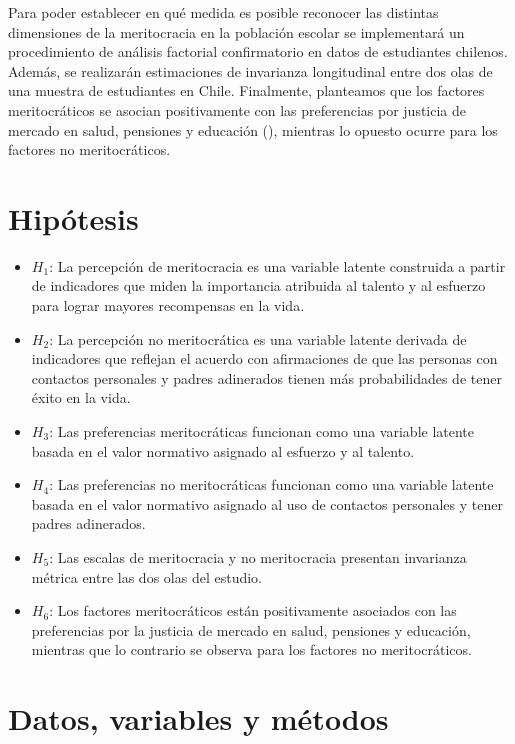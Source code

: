 \documentclass[
  12pt,
  letterpaper,
]{article}
\providecommand{\tightlist}{%
  \setlength{\itemsep}{0pt}\setlength{\parskip}{0pt}}\usepackage{longtable,booktabs,array}
\begin{document}
Para poder establecer en qué medida es posible reconocer las distintas
dimensiones de la meritocracia en la población escolar se implementará
un procedimiento de análisis factorial confirmatorio en datos de
estudiantes chilenos. Además, se realizarán estimaciones de invarianza
longitudinal entre dos olas de una muestra de estudiantes en Chile.
Finalmente, planteamos que los factores meritocráticos se asocian
positivamente con las preferencias por justicia de mercado en salud,
pensiones y educación (),
mientras lo opuesto ocurre para los factores no meritocráticos.

\section{Hipótesis}\label{hipuxf3tesis}

\begin{itemize}
\tightlist
\item
  \(H_1\): La percepción de meritocracia es una variable latente
  construida a partir de indicadores que miden la importancia atribuida
  al talento y al esfuerzo para lograr mayores recompensas en la vida.
\item
  \(H_2\): La percepción no meritocrática es una variable latente
  derivada de indicadores que reflejan el acuerdo con afirmaciones de
  que las personas con contactos personales y padres adinerados tienen
  más probabilidades de tener éxito en la vida.
\item
  \(H_3\): Las preferencias meritocráticas funcionan como una variable
  latente basada en el valor normativo asignado al esfuerzo y al
  talento.
\item
  \(H_4\): Las preferencias no meritocráticas funcionan como una
  variable latente basada en el valor normativo asignado al uso de
  contactos personales y tener padres adinerados.
\item
  \(H_5\): Las escalas de meritocracia y no meritocracia presentan
  invarianza métrica entre las dos olas del estudio.
\item
  \(H_6\): Los factores meritocráticos están positivamente asociados con
  las preferencias por la justicia de mercado en salud, pensiones y
  educación, mientras que lo contrario se observa para los factores no
  meritocráticos.
\end{itemize}

\section{Datos, variables y métodos}\label{datos-variables-y-muxe9todos}
\end{document}
